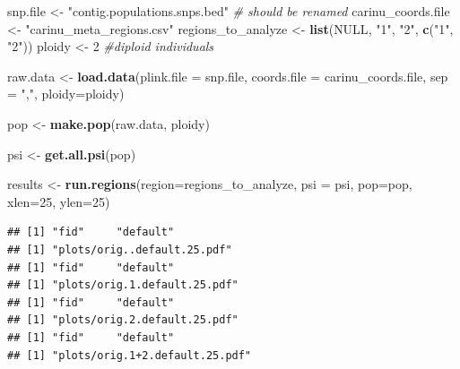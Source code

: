 \documentclass[]{article}
\newenvironment{Shaded}{\begin{snugshade}}{\end{snugshade}}
\newcommand{\KeywordTok}[1]{\textcolor[rgb]{0.13,0.29,0.53}{\textbf{#1}}}
\newcommand{\DataTypeTok}[1]{\textcolor[rgb]{0.13,0.29,0.53}{#1}}
\newcommand{\DecValTok}[1]{\textcolor[rgb]{0.00,0.00,0.81}{#1}}
\newcommand{\StringTok}[1]{\textcolor[rgb]{0.31,0.60,0.02}{#1}}
\newcommand{\CommentTok}[1]{\textcolor[rgb]{0.56,0.35,0.01}{\textit{#1}}}
\newcommand{\OtherTok}[1]{\textcolor[rgb]{0.56,0.35,0.01}{#1}}
\newcommand{\OperatorTok}[1]{\textcolor[rgb]{0.81,0.36,0.00}{\textbf{#1}}}
\newcommand{\NormalTok}[1]{#1}
\begin{document}
\begin{Shaded}
\begin{Highlighting}[]
\NormalTok{snp.file <-}\StringTok{ "contig.populations.snps.bed"} \CommentTok{# should be renamed }
\NormalTok{carinu_coords.file <-}\StringTok{ "carinu_meta_regions.csv"}
\NormalTok{regions_to_analyze <-}\StringTok{ }\KeywordTok{list}\NormalTok{(}\OtherTok{NULL}\NormalTok{,}
                           \StringTok{"1"}\NormalTok{, }
                           \StringTok{"2"}\NormalTok{,}
                           \KeywordTok{c}\NormalTok{(}\StringTok{"1"}\NormalTok{, }\StringTok{"2"}\NormalTok{))}
\NormalTok{ploidy <-}\StringTok{ }\DecValTok{2} \CommentTok{#diploid individuals}

\NormalTok{raw.data <-}\StringTok{ }\KeywordTok{load.data}\NormalTok{(}\DataTypeTok{plink.file =}\NormalTok{ snp.file, }\DataTypeTok{coords.file =}\NormalTok{ carinu_coords.file, }\DataTypeTok{sep =} \StringTok{","}\NormalTok{, }\DataTypeTok{ploidy=}\NormalTok{ploidy)}

\NormalTok{pop <-}\StringTok{ }\KeywordTok{make.pop}\NormalTok{(raw.data, ploidy)}

\NormalTok{psi <-}\StringTok{ }\KeywordTok{get.all.psi}\NormalTok{(pop)}

\NormalTok{results <-}\StringTok{ }\KeywordTok{run.regions}\NormalTok{(}\DataTypeTok{region=}\NormalTok{regions_to_analyze, }\DataTypeTok{psi =}\NormalTok{ psi,  }\DataTypeTok{pop=}\NormalTok{pop, }\DataTypeTok{xlen=}\DecValTok{25}\NormalTok{, }\DataTypeTok{ylen=}\DecValTok{25}\NormalTok{)}
\end{Highlighting}
\end{Shaded}

\begin{verbatim}
## [1] "fid"     "default"
## [1] "plots/orig..default.25.pdf"
## [1] "fid"     "default"
## [1] "plots/orig.1.default.25.pdf"
## [1] "fid"     "default"
## [1] "plots/orig.2.default.25.pdf"
## [1] "fid"     "default"
## [1] "plots/orig.1+2.default.25.pdf"
\end{verbatim}

\begin{Shaded}
\end{Shaded}
\end{document}
